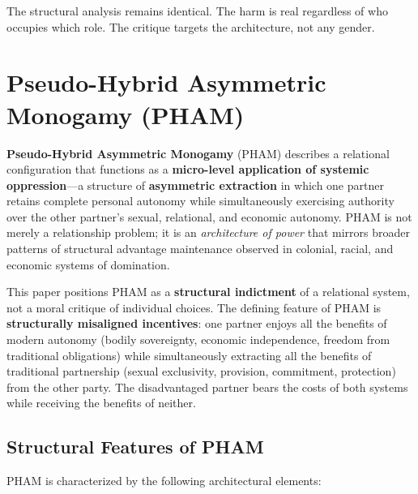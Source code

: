 \documentclass[12pt,openany]{book}
\numberwithin{equation}{chapter}
\begin{document}
The structural analysis remains identical. The harm is real regardless of who occupies which role. The critique targets the architecture, not any gender.

\section{Pseudo-Hybrid Asymmetric Monogamy (PHAM)}

\textbf{Pseudo-Hybrid Asymmetric Monogamy} (PHAM) describes a relational configuration that functions as a \textbf{micro-level application of systemic oppression}---a structure of \textbf{asymmetric extraction} in which one partner retains complete personal autonomy while simultaneously exercising authority over the other partner's sexual, relational, and economic autonomy. PHAM is not merely a relationship problem; it is an \textit{architecture of power} that mirrors broader patterns of structural advantage maintenance observed in colonial, racial, and economic systems of domination.

This paper positions PHAM as a \textbf{structural indictment} of a relational system, not a moral critique of individual choices. The defining feature of PHAM is \textbf{structurally misaligned incentives}: one partner enjoys all the benefits of modern autonomy (bodily sovereignty, economic independence, freedom from traditional obligations) while simultaneously extracting all the benefits of traditional partnership (sexual exclusivity, provision, commitment, protection) from the other party. The disadvantaged partner bears the costs of both systems while receiving the benefits of neither.

\subsection{Structural Features of PHAM}

PHAM is characterized by the following architectural elements:
\end{document}
